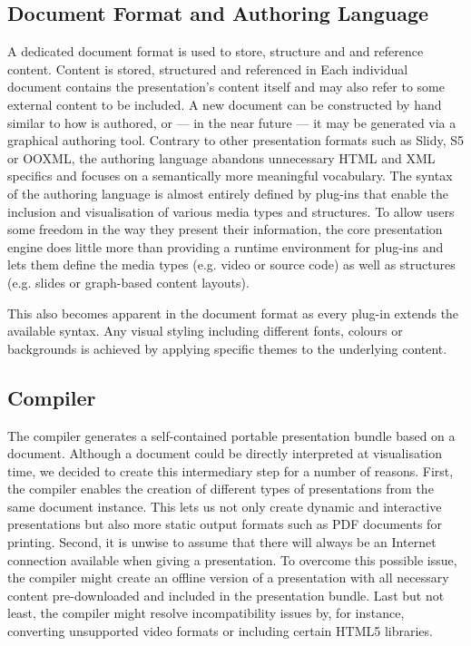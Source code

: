 
   \subsection{Document Format and Authoring Language}

    A dedicated \mxp document format is used to store, structure and and
    reference content. Content is stored, structured and referenced in Each
    individual \mxp document contains the presentation's content itself and may
    also refer to some external content to be included. A new \mxp document can
    be constructed by hand similar to how \latex is authored, or --- in the
    near future --- it may be generated via a graphical authoring tool.
    Contrary to other presentation formats such as Slidy, S5 or OOXML, the \mxp
    authoring language abandons unnecessary HTML and XML specifics and focuses
    on a semantically more meaningful vocabulary. The syntax of the authoring
    language is almost entirely defined by plug-ins that enable the inclusion
    and visualisation of various media types and structures. To allow users
    some freedom in the way they present their information, the core \mxp
    presentation engine does little more than providing a runtime environment
    for plug-ins and lets them define the media types (e.g. video or source
    code) as well as structures (e.g. slides or graph-based content layouts).

    This also becomes apparent in the document format as every plug-in extends the
    available syntax. Any visual styling including different fonts,
    colours or backgrounds is achieved by applying specific themes to the
    underlying content.

   \subsection{Compiler}

    The compiler generates a self-contained portable \mxp presentation bundle
    based on a \mxp document. Although a \mxp document could be directly
    interpreted at visualisation time, we decided to create this intermediary
    step for a number of reasons. First, the compiler enables the creation of
    different types of presentations from the same \mxp document instance.
    This lets us not only create dynamic and interactive presentations but also
    more static output formats such as PDF documents for printing. Second, it
    is unwise to assume that there will always be an Internet connection
    available when giving a presentation. To overcome this possible issue, the
    compiler might create an offline version of a presentation with all
    necessary content pre-downloaded and included in the \mxp presentation
    bundle. Last but not least, the compiler might resolve incompatibility
    issues by, for instance, converting unsupported video formats or including
    certain HTML5 libraries.


